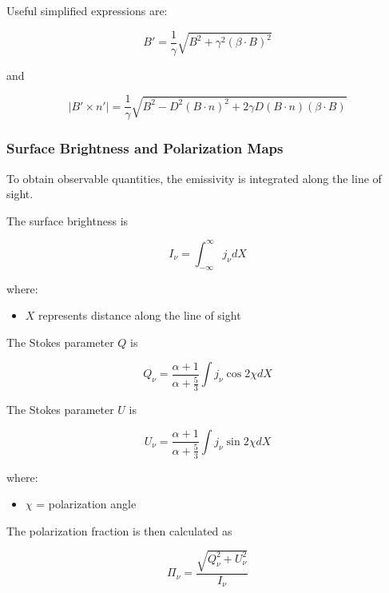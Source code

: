 \documentclass{article}
\begin{document}
Useful simplified expressions are:

\begin{equation}
B'
=
\frac{1}{\gamma}
\sqrt{
B^2+
\gamma^2
(\beta\cdot B)^2
}
\end{equation}

and

\begin{equation}
|B'\times n'|
=
\frac{1}{\gamma}
\sqrt{
B^2
-
D^2(B\cdot n)^2
+
2\gamma D
(B\cdot n)
(\beta\cdot B)
}
\end{equation}

\subsubsection{Surface Brightness and Polarization Maps}

To obtain observable quantities, the emissivity is integrated along the line of sight.

The surface brightness is

\begin{equation}
I_\nu
=
\int_{-\infty}^{\infty}
j_\nu dX
\end{equation}

where:

\begin{itemize}
\item $X$ represents distance along the line of sight
\end{itemize}

The Stokes parameter $Q$ is

\begin{equation}
Q_\nu
=
\frac{\alpha+1}
{\alpha+\frac{5}{3}}
\int
j_\nu
\cos2\chi
dX
\end{equation}

The Stokes parameter $U$ is

\begin{equation}
U_\nu
=
\frac{\alpha+1}
{\alpha+\frac{5}{3}}
\int
j_\nu
\sin2\chi
dX
\end{equation}

where:

\begin{itemize}
\item $\chi$ = polarization angle
\end{itemize}

The polarization fraction is then calculated as

\begin{equation}
\Pi_\nu
=
\frac{
\sqrt{
Q_\nu^2+U_\nu^2
}
}
{I_\nu}
\end{equation}
\end{document}
